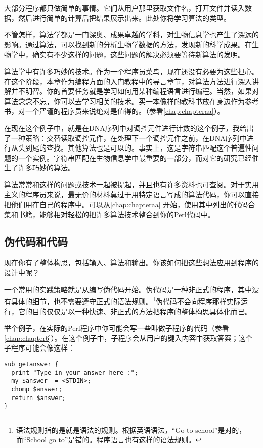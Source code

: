 大部分程序都只做简单的事情。它们从用户那里获取文件名，打开文件并读入数据，然后进行简单的计算后把结果展示出来。此处你将学习算法的类型。

不管怎样，算法学都是一门深奥、成果卓越的学科，对生物信息学也产生了深远的影响。通过算法，可以找到新的分析生物学数据的方法，发现新的科学成果。在生物学中，确实有不少这样的问题，这些问题的解决必须要等待新算法的发明。

算法学中有许多巧妙的技术。作为一个程序员菜鸟，现在还没有必要为这些担心。在这个阶段，本章作为编程方面的入门教程中的导言章节，对算法方法进行深入讲解并不明智。你的首要任务就是学习如何用某种编程语言进行编程。当然，如果对算法念念不忘，你可以去学习相关的技术。买一本像样的教科书放在身边作为参考书，对一个严谨的程序员来说绝对是值得的。（参看\autoref{chap:chapteraa}）。

在现在这个例子中，就是在DNA序列中对调控元件进行计数的这个例子，我给出了一种策略：交替读取调控元件，在处理下一个调控元件之前，在DNA序列中进行从头到尾的查找。其他算法也是可以的。事实上，这是字符串匹配这个普遍性问题的一个实例。字符串匹配在生物信息学中最重要的一部分，而对它的研究已经催生了许多巧妙的算法。

算法常常和这样的问题或技术一起被提起，并且也有许多资料也可查阅。对于实用主义的程序员来说，最无价的材料莫过于用特定语言写成的算法代码，你可以直接把他们用在自己的程序中。可以从\autoref{chap:chapteraa} 开始，使用其中列出的代码合集和书籍，能够相对轻松的把许多算法技术整合到你的Perl代码中。

\subsection{伪代码和代码}
现在你有了整体构思，包括输入、算法和输出。你该如何把这些想法应用到程序的设计中呢？

一个常用的实践策略就是从编写伪代码开始。伪代码是一种非正式的程序，其中没有具体的细节，也不需要遵守正式的语法规则。\footnote{语法规则指的是就是语法的规则。根据英语语法，“Go to school”是对的，而“School go to”是错的。程序语言也有这样的语法规则。}伪代码不会向程序那样实际运行，它的目的仅仅是以一种快速、非正式的方法把程序的整体构思具体化而已。

举个例子，在实际的Perl程序中你可能会写一些叫做子程序的代码（参看\autoref{chap:chapter6}）。在这个例子中，子程序会从用户的键入内容中获取答案；这个子程序可能会像这样：

\begin{lstlisting}
sub getanswer {
  print "Type in your answer here :";
  my $answer  = <STDIN>;
  chomp $answer;
  return $answer;
}
\end{lstlisting}

